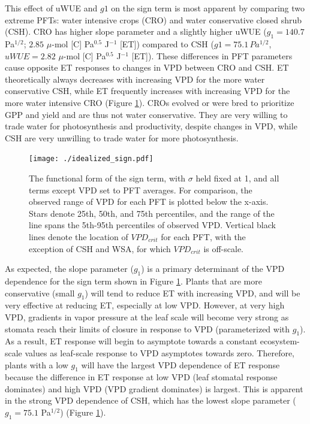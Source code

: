 \documentclass[draft,linenumbers]{afmjournal}
\begin{document}
This effect of uWUE and $g1$ on the sign term is most apparent by
comparing two extreme PFTs: water intensive crops (CRO) and water
conservative closed shrub (CSH). CRO has higher slope parameter and a
slightly higher uWUE ($g_1 = 140.7$ Pa$^{1/2}$; $2.85$ $\mu$-mol [C]
Pa$^{0.5}$ J$^{-1}$ [ET]) compared to CSH ($g1 = 75.1 \, Pa^{1/2}$,
$uWUE=2.82$ $\mu$-mol [C] Pa$^{0.5}$ J$^{-1}$ [ET]). These differences
in PFT parameters cause opposite ET responses to changes in VPD
between CRO and CSH. ET theoretically always decreases with increasing
VPD for the more water conservative CSH, while ET frequently increases
with increasing VPD for the more water intensive CRO (Figure
\ref{idealized_sign}). CROs evolved or were bred to prioritize GPP and
yield and are thus not water conservative. They are very willing to
trade water for photosynthesis and productivity, despite changes in
VPD, while CSH are very unwilling to trade water for more
photosynthesis.

\begin{figure}
  \centering \texttt{[image: ./idealized\_sign.pdf]}
  \caption{The functional form of the sign term, with $\sigma$ held
    fixed at 1, and all terms except VPD set to PFT averages. For
    comparison, the observed range of VPD for each PFT is plotted
    below the x-axis. Stars denote 25th, 50th, and 75th percentiles,
    and the range of the line spans the 5th-95th percentiles of
    observed VPD. Vertical black lines denote the location of
    $VPD_{crit}$ for each PFT, with the exception of CSH and WSA, for which
    $VPD_{crit}$ is off-scale.}
  \label{idealized_sign}
\end{figure}


As expected, the slope parameter ($g_1$) is a primary determinant of
the VPD dependence for the sign term shown in Figure
\ref{idealized_sign}. Plants that are more conservative (small $g_1$)
will tend to reduce ET with increasing VPD, and will be very effective
at reducing ET, especially at low VPD. However, at very high VPD,
gradients in vapor pressure at the leaf scale will become very strong
as stomata reach their limits of closure in response to VPD
(parameterized with $g_1$). As a result, ET response will begin to
asymptote towards a constant ecosystem-scale values as leaf-scale
response to VPD asymptotes towards zero.  Therefore, plants with a low
$g_1$ will have the largest VPD dependence of ET response because the
difference in ET response at low VPD (leaf stomatal response
dominates) and high VPD (VPD gradient dominates) is largest. This is
apparent in the strong VPD dependence of CSH, which has the lowest
slope parameter ($g_1=75.1$ Pa$^{1/2}$) (Figure \ref{idealized_sign}).
\end{document}
